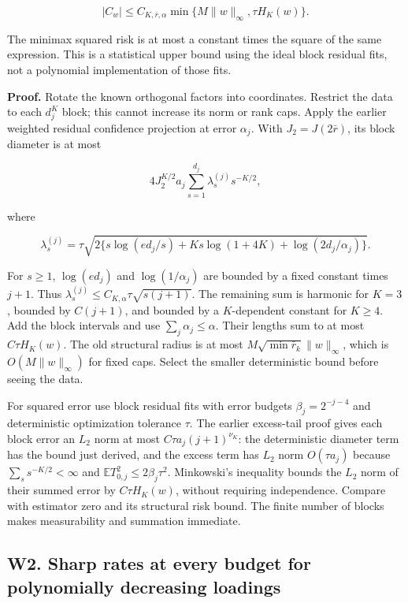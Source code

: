 \documentclass[
  10pt,
]{article}
\begin{document}
\[|C_w|\le C_{K,\bar r,\alpha}
\min\{M\|w\|_\infty,\tau H_K(w)\}.\]

The minimax squared risk is at most a constant times the square of the
same expression. This is a statistical upper bound using the ideal block
residual fits, not a polynomial implementation of those fits.

\textbf{Proof.} Rotate the known orthogonal factors into coordinates.
Restrict the data to each \(d_j^K\) block; this cannot increase its norm
or rank caps. Apply the earlier weighted residual confidence projection
at error \(\alpha_j\). With \(J_2=J(2\bar r)\), its block diameter is at
most

\[4J_2^{K/2}a_j\sum_{s=1}^{d_j}\lambda_s^{(j)}s^{-K/2},\]

where

\[\lambda_s^{(j)}=\tau\sqrt{2\{s\log(ed_j/s)+Ks\log(1+4K)
+\log(2d_j/\alpha_j)\}}.\]

For \(s\ge1\), \(\log(ed_j)\) and \(\log(1/\alpha_j)\) are bounded by a
fixed constant times \(j+1\). Thus
\(\lambda_s^{(j)}\le C_{K,\alpha}\tau\sqrt{s(j+1)}\). The remaining sum
is harmonic for \(K=3\), bounded by \(C(j+1)\), and bounded by a
\(K\)-dependent constant for \(K\ge4\). Add the block intervals and use
\(\sum_j\alpha_j\le\alpha\). Their lengths sum to at most
\(C\tau H_K(w)\). The old structural radius is at most
\(M\sqrt{\min\bar r_k}\|w\|_\infty\), which is \(O(M\|w\|_\infty)\) for
fixed caps. Select the smaller deterministic bound before seeing the
data.

For squared error use block residual fits with error budgets
\(\beta_j=2^{-j-4}\) and deterministic optimization tolerance \(\tau\).
The earlier excess-tail proof gives each block error an \(L_2\) norm at
most \(C\tau a_j(j+1)^{\nu_K}\): the deterministic diameter term has the
bound just derived, and the excess term has \(L_2\) norm \(O(\tau a_j)\)
because \(\sum_s s^{-K/2}<\infty\) and
\(\mathbb E T_{0,j}^2\le2\beta_j\tau^2\). Minkowski's inequality bounds
the \(L_2\) norm of their summed error by \(C\tau H_K(w)\), without
requiring independence. Compare with estimator zero and its structural
risk bound. The finite number of blocks makes measurability and
summation immediate.

\subsection{W2. Sharp rates at every budget for polynomially decreasing
loadings}\label{w2.-sharp-rates-at-every-budget-for-polynomially-decreasing-loadings}
\end{document}
